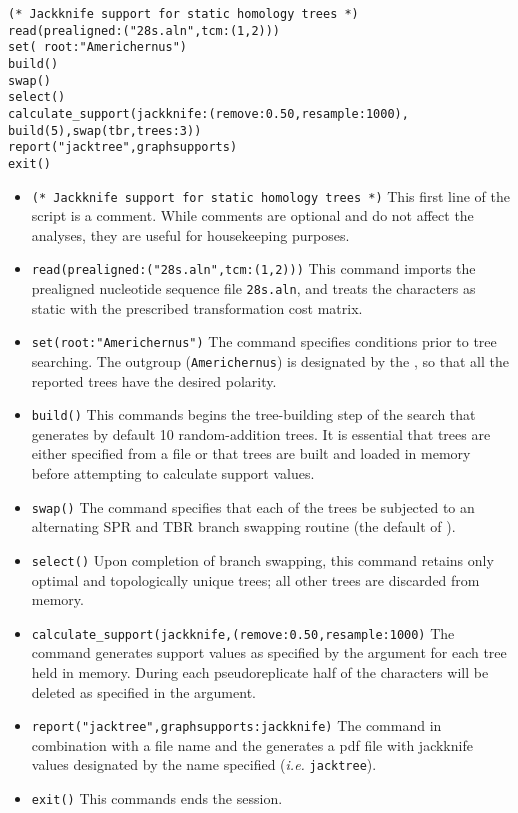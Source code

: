 \begin{verbatim}
(* Jackknife support for static homology trees *)
read(prealigned:("28s.aln",tcm:(1,2)))
set( root:"Americhernus")
build()
swap()
select()
calculate_support(jackknife:(remove:0.50,resample:1000), 
build(5),swap(tbr,trees:3))
report("jacktree",graphsupports)
exit()
\end{verbatim}

\begin{itemize}
\item \texttt{(* Jackknife support for static homology trees *)} This first line of the script is a comment. While comments are optional and do not affect the analyses, they are useful for housekeeping purposes.
\item \texttt{read(prealigned:("28s.aln",tcm:(1,2)))} This command imports the prealigned nucleotide sequence file \texttt{28s.aln}, and treats the characters as static with the prescribed transformation cost matrix.
\item \texttt{set(root:"Americhernus")} The  command specifies conditions prior to tree searching. The outgroup (\texttt{Americhernus}) is designated by the , so that all the reported trees have the desired polarity.     
\item \texttt{build()} This commands begins the tree-building step of the search that generates by default 10 random-addition trees. It is essential that trees are either specified from a file or that trees are built and loaded in memory before attempting to calculate support values.
\item \texttt{swap()} The  command specifies that each of the trees be subjected to an alternating SPR and TBR branch swapping routine (the default of \poy).
\item \texttt{select()} Upon completion of branch swapping, this command retains only optimal and topologically unique trees; all other trees are discarded from memory. 
\item \texttt{calculate\_support(jackknife,(remove:0.50,resample:1000)} The  command generates support values as specified by the  argument for each tree held in memory. During each pseudoreplicate half of the characters will be deleted as specified in the argument. 
\item \texttt{report("jacktree",graphsupports:jackknife)}  The  command in combination with a file name and the  generates a pdf file with jackknife values designated by the name specified (\emph{i.e.} \texttt{jacktree}). 
\item \texttt{exit()} This commands ends the \poy session.
\end{itemize}

